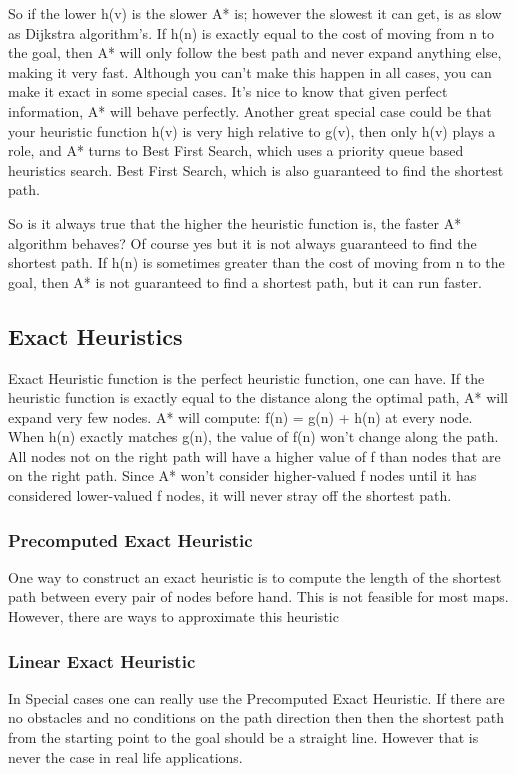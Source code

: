 \documentclass[12pt]{article}
\begin{document}
So if the lower h(v) is the slower A* is; however the slowest it can get, is as slow as Dijkstra algorithm's. If h(n) is exactly equal to the cost of moving from n to the goal, then A* will only follow the best path and never expand anything else, making it very fast. Although you can’t make this happen in all cases, you can make it exact in some special cases. It’s nice to know that given perfect information, A* will behave perfectly. Another great special case could be that your heuristic function h(v) is very high relative to g(v), then only h(v) plays a role, and A* turns to Best First Search, which uses a priority queue based heuristics search. Best First Search, which is also guaranteed to find the shortest path.

So is it always true that the higher the heuristic function is, the faster A* algorithm behaves? Of course yes but it is not always guaranteed to find the shortest path. If h(n) is sometimes greater than the cost of moving from n to the goal, then A* is not guaranteed to find a shortest path, but it can run faster.

\newpage
\subsection{Exact Heuristics}
Exact Heuristic function is the perfect heuristic function, one can have. If the heuristic function is exactly equal to the distance along the optimal path, A* will expand very few nodes. A* will compute:  f(n) = g(n) + h(n) at every node. When h(n) exactly matches g(n), the value of f(n) won't change along the path. All nodes not on the right path will have a higher value of f than nodes that are on the right path. Since A* won't consider higher-valued f nodes until it has considered lower-valued f nodes, it will never stray off the shortest path.

\subsubsection{Precomputed Exact Heuristic}
One way to construct an exact heuristic is to compute the length of the shortest path between every pair of nodes before hand. This is not feasible for most maps. However, there are ways to approximate this heuristic

\subsubsection{Linear Exact Heuristic}
In Special cases one can really use the Precomputed Exact Heuristic. If there are no obstacles and no conditions on the path direction then then the shortest path from the starting point to the goal should be a straight line. However that is never the case in real life applications.
\end{document}
